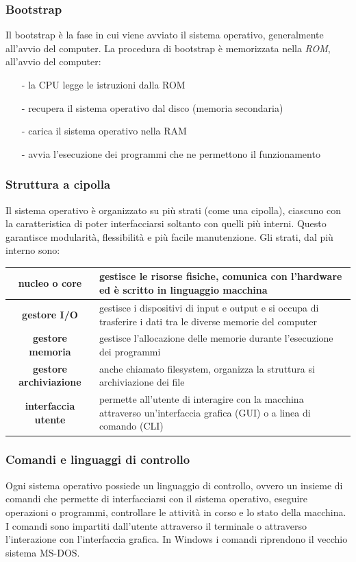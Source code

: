 \documentclass{article}
\begin{document}
\subsubsection*{Bootstrap}
Il bootstrap è la fase in cui viene avviato il sistema operativo, generalmente all'avvio del computer.
La procedura di bootstrap è memorizzata nella \textit{ROM}, all'avvio del computer:
\begin{itemize}[topsep=3pt, itemsep=0pt]
	\item[-] la CPU legge le istruzioni dalla ROM
	\item[-] recupera il sistema operativo dal disco (memoria secondaria)
	\item[-] carica il sistema operativo nella RAM
	\item[-] avvia l'esecuzione dei programmi che ne permettono il funzionamento
\end{itemize}

\subsubsection*{Struttura a cipolla}
Il sistema operativo è organizzato su più strati (come una cipolla), ciascuno con la caratteristica di poter interfacciarsi
soltanto con quelli più interni. Questo garantisce modularità, flessibilità e più facile manutenzione.
Gli strati, dal più interno sono:
\begin{center}
	\begin{tabularx}{\textwidth}{c X}
		\textbf{nucleo o core} & gestisce le risorse fisiche, comunica con l'hardware ed è scritto in linguaggio macchina \\
		\midrule
		\textbf{gestore I/O} & gestisce i dispositivi di input e output e si occupa di trasferire i dati tra le diverse
		memorie del computer \\
		\midrule
		\textbf{gestore memoria} & gestisce l'allocazione delle memorie durante l'esecuzione dei programmi \\
		\midrule
		\textbf{gestore archiviazione} & anche chiamato filesystem, organizza la struttura si archiviazione dei file \\
		\midrule
		\textbf{interfaccia utente} & permette all'utente di interagire con la macchina attraverso un'interfaccia grafica (GUI)
		o a linea di comando (CLI) \\
	\end{tabularx}
\end{center}

\subsubsection*{Comandi e linguaggi di controllo}
Ogni sistema operativo possiede un linguaggio di controllo, ovvero un insieme di comandi che permette di interfacciarsi
con il sistema operativo, eseguire operazioni o programmi, controllare le attività in corso e lo stato della macchina.
I comandi sono impartiti dall'utente attraverso il terminale o attraverso l'interazione con l'interfaccia grafica.
In Windows i comandi riprendono il vecchio sistema MS-DOS.
\end{document}
